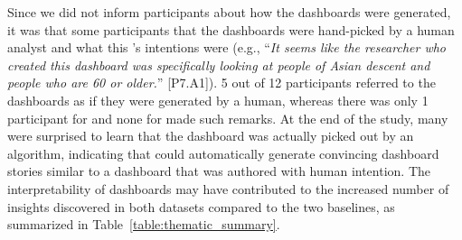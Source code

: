 
\par Since we did not inform participants about how the dashboards were generated, it was  that some participants  that the dashboards were hand-picked by a human analyst and  what this 's intentions were (e.g., ``\textit{It seems like the researcher who created this dashboard was specifically looking at people of Asian descent and people who are 60 or older.}'' [P7.A1]).  5 out of 12 participants referred to the \system dashboards as if they were generated by a human, whereas there was only 1 participant for \cluster and none for \BFS made such remarks. At the end of the study, many were surprised to learn that the \system dashboard was actually picked out by an algorithm, indicating that \system could automatically generate convincing dashboard stories similar to a dashboard that was authored with human intention. The interpretability of \system dashboards may have contributed to the increased number of insights discovered in both datasets compared to the two baselines, as summarized in Table~\ref{table:thematic_summary}.
